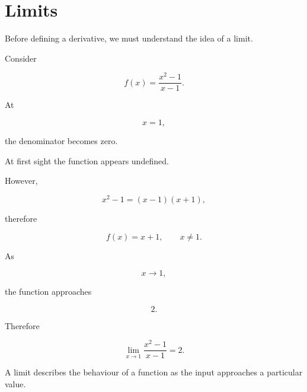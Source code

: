 \section{Limits}

Before defining a derivative, we must understand the idea of a limit.

Consider

\[
f(x)=\frac{x^2-1}{x-1}.
\]

At

\[
x=1,
\]

the denominator becomes zero.

At first sight the function appears undefined.

However,

\[
x^2-1=(x-1)(x+1),
\]

therefore

\[
f(x)=x+1,
\qquad x\neq1.
\]

As

\[
x\rightarrow1,
\]

the function approaches

\[
2.
\]

Therefore

\[
\boxed{
	\lim_{x\rightarrow1}
	\frac{x^2-1}{x-1}
	=2.
}
\]

A limit describes the behaviour of a function as the input approaches
a particular value.

